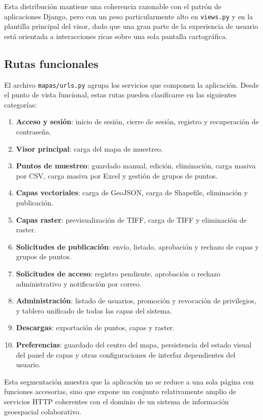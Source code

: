 \documentclass[12pt,a4paper]{report}
\begin{document}
Esta distribuci\'on mantiene una coherencia razonable con el patr\'on de aplicaciones Django, pero con un peso particularmente alto en \texttt{views.py} y en la plantilla principal del visor, dado que una gran parte de la experiencia de usuario est\'a orientada a interacciones ricas sobre una sola pantalla cartogr\'afica.

\subsection{Rutas funcionales}

El archivo \texttt{mapas/urls.py} agrupa los servicios que componen la aplicaci\'on. Desde el punto de vista funcional, estas rutas pueden clasificarse en las siguientes categor\'ias:

\begin{enumerate}
    \item \textbf{Acceso y sesi\'on}: inicio de sesi\'on, cierre de sesi\'on, registro y recuperaci\'on de contrase\~na.
    \item \textbf{Visor principal}: carga del mapa de muestreo.
    \item \textbf{Puntos de muestreo}: guardado manual, edici\'on, eliminaci\'on, carga masiva por CSV, carga masiva por Excel y gesti\'on de grupos de puntos.
    \item \textbf{Capas vectoriales}: carga de GeoJSON, carga de Shapefile, eliminaci\'on y publicaci\'on.
    \item \textbf{Capas raster}: previsualizaci\'on de TIFF, carga de TIFF y eliminaci\'on de raster.
    \item \textbf{Solicitudes de publicaci\'on}: env\'io, listado, aprobaci\'on y rechazo de capas y grupos de puntos.
    \item \textbf{Solicitudes de acceso}: registro pendiente, aprobaci\'on o rechazo administrativo y notificaci\'on por correo.
    \item \textbf{Administraci\'on}: listado de usuarios, promoci\'on y revocaci\'on de privilegios, y tablero unificado de todas las capas del sistema.
    \item \textbf{Descargas}: exportaci\'on de puntos, capas y raster.
    \item \textbf{Preferencias}: guardado del centro del mapa, persistencia del estado visual del panel de capas y otras configuraciones de interfaz dependientes del usuario.
\end{enumerate}

Esta segmentaci\'on muestra que la aplicaci\'on no se reduce a una sola p\'agina con funciones accesorias, sino que expone un conjunto relativamente amplio de servicios HTTP coherentes con el dominio de un sistema de informaci\'on geoespacial colaborativo.
\end{document}
